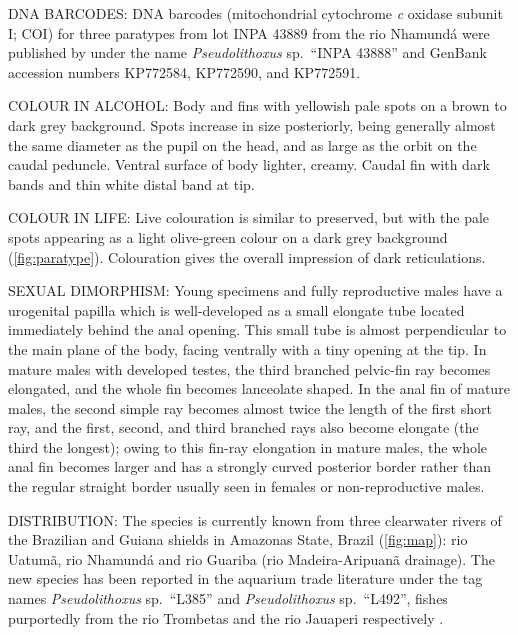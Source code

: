 \documentclass[12pt]{article}
\begin{document}
\noindent DNA BARCODES: DNA barcodes (mitochondrial cytochrome \emph{c} oxidase subunit I; COI) for three paratypes from lot INPA 43889 from the rio Nhamundá were published by \citet{Collins2015} under the name \emph{Pseudolithoxus} sp.\ ``INPA 43888'' and GenBank accession numbers KP772584, KP772590, and KP772591.\\%
\bigskip

\noindent COLOUR IN ALCOHOL:  Body and fins with yellowish pale spots on a brown to dark grey background. %
Spots increase in size posteriorly, being generally almost the same diameter as the pupil on the head, and as large as the orbit on the caudal peduncle. %
Ventral surface of body lighter, creamy. %
Caudal fin with dark bands and thin white distal band at tip.\\%
\bigskip

\noindent COLOUR IN LIFE: Live colouration is similar to preserved, but with the pale spots appearing as a light olive-green colour on a dark grey background (\autoref{fig:paratype}). %
Colouration gives the overall impression of dark reticulations.\\%
\bigskip

\noindent SEXUAL DIMORPHISM: Young specimens and fully reproductive males have a urogenital papilla which is well-developed as a small elongate tube located immediately behind the anal opening. %
This small tube is almost perpendicular to the main plane of the body, facing ventrally with a tiny opening at the tip. %
In mature males with developed testes, the third branched pelvic-fin ray becomes elongated, and the whole fin becomes lanceolate shaped. %
In the anal fin of mature males, the second simple ray becomes almost twice the length of the first short ray, and the first, second, and third branched rays also become elongate (the third the longest); owing to this fin-ray elongation in mature males, the whole anal fin becomes larger and has a strongly curved posterior border rather than the regular straight border usually seen in females or non-reproductive males.\\%
\bigskip

\noindent DISTRIBUTION: The species is currently known from three clearwater rivers of the Brazilian and Guiana shields in Amazonas State, Brazil (\autoref{fig:map}): rio Uatumã, rio Nhamundá and rio Guariba (rio Madeira-Aripuanã drainage). %
The new species has been reported in the aquarium trade literature under the tag names \emph{Pseudolithoxus} sp.\ ``L385'' and \emph{Pseudolithoxus} sp.\ ``L492'', fishes purportedly from the rio Trombetas and the rio Jauaperi  respectively \citep{Dignall2018,Seidel2005}.\\%
\bigskip
\end{document}

